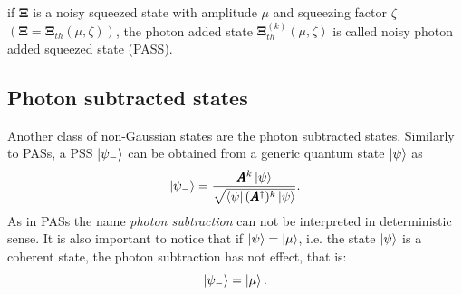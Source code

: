         if $\pmb{\Xi}$ is a noisy squeezed state with amplitude $\mu$ and squeezing factor 
        $\zeta$ $(\pmb{\Xi}=\pmb{\Xi}_{th}(\mu,\zeta))$, the photon added state $\pmb{\Xi}_{th}^{(k)}
        (\mu,\zeta)$ is called noisy photon added squeezed state (PASS).

    \subsection{Photon subtracted states}
        Another class of non-Gaussian states are the photon subtracted states. Similarly to PASs, a PSS 
        $\ket{\psi_-}$ can be obtained from a generic quantum state $\ket{\psi}$ as
        \begin{equation}
            \ket{\psi_-} = \frac{\pmb{A}^k \ket{\psi}}{\sqrt{\bra{\psi}(\pmb{A}^\dagger)^k\ket{\psi}}}.
        \end{equation}
        As in PASs the name \emph{photon subtraction} can not be interpreted in deterministic sense.
        It is also important to notice that if $\ket{\psi}=\ket{\mu}$, i.e. the state $\ket{\psi}$ is 
        a coherent state, the photon subtraction has not effect, that is:
        \begin{equation*}
            \ket{\psi_-}=\ket{\mu}.
        \end{equation*}
